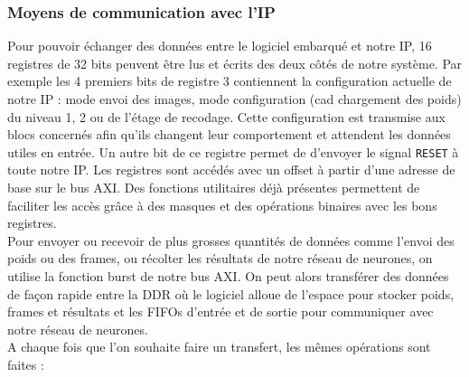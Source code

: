 \subsubsection{Moyens de communication avec l'IP}
Pour pouvoir échanger des données entre le logiciel embarqué et notre IP, 16
registres de 32 bits peuvent être lus et écrits des deux côtés de notre
système. Par exemple
les 4 premiers bits de registre 3 contiennent la configuration actuelle de notre
IP : mode envoi des images, mode configuration (cad chargement des poids) du
niveau 1, 2 ou de l'étage de recodage. Cette configuration est transmise
aux blocs concernés afin qu'ils changent leur comportement et attendent les
données utiles en entrée. Un autre bit de ce registre permet de d'envoyer le
signal \texttt{RESET} à toute notre IP.
Les registres sont accédés avec un offset à partir d'une adresse de base
sur le bus AXI. Des fonctions utilitaires déjà présentes
permettent de faciliter les accès grâce à des masques et des opérations
binaires avec les bons registres. \\
Pour envoyer ou recevoir de plus grosses quantités de données comme l'envoi
des poids ou des frames, ou récolter les résultats de notre réseau de neurones,
on utilise la fonction burst de notre bus AXI. On peut alors transférer des
données de façon rapide entre la DDR où le logiciel alloue de l'espace
pour stocker poids, frames et résultats et les FIFOs d'entrée et de sortie pour
communiquer avec notre réseau de neurones. \\
A chaque fois que l'on souhaite faire un transfert, les mêmes opérations sont
faites :

